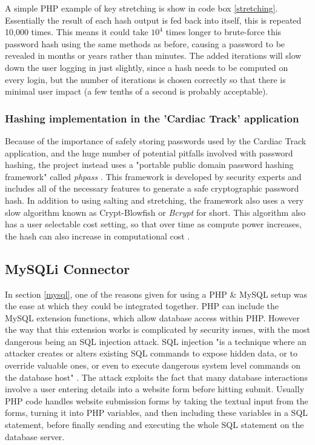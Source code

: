 \documentclass[11pt]{article}
\begin{document}
A simple PHP example of key stretching is show  in code box \ref{stretching}. Essentially the result of each hash output is fed back into itself, this is repeated 10,000 times. This means it could take \(10^4\) times longer to brute-force this password hash using the same methods as before, causing a password to be revealed in months or years rather than minutes. The added iterations will slow down the user logging in just slightly, since a hash needs to be computed on every login, but the number of iterations is chosen correctly so that there is minimal user impact (a few tenths of a second is probably acceptable). 

\subsubsection{Hashing implementation in the 'Cardiac Track' application} \label{phpass-section}

Because of the importance of safely storing passwords used by the Cardiac Track application, and the huge number of potential pitfalls involved with password hashing, the project instead uses a "portable public domain password hashing framework" called \textit{phpass} \cite{phpass}. This framework is developed by security experts and includes all of the necessary features to generate a safe cryptographic password hash. In addition to using salting and stretching, the framework also uses a very slow algorithm known as Crypt-Blowfish or \textit{Bcrypt} for short. This algorithm also has a user selectable cost setting, so that over time as compute power increases, the hash can also increase in computational cost \cite{bcrypt}.

\subsection{MySQLi Connector} \label{mysqli}
In section \ref{mysql}, one of the reasons given for using a PHP \& MySQL setup was the ease at which they could be integrated together. PHP can include the MySQL extension functions, which allow database access within PHP. However the way that this extension works is complicated by security issues, with the most dangerous being an SQL injection attack. SQL injection "is a technique where an attacker creates or alters existing SQL commands to expose hidden data, or to override valuable ones, or even to execute dangerous system level commands on the database host" \cite{sqlinjection:phpmanual}. The attack exploits the fact that many database interactions involve a user entering details into a website form before hitting submit. Usually PHP code handles website submission forms by taking the textual input from the forms, turning it into PHP variables, and then  including these variables in a SQL statement, before finally sending and executing the whole SQL statement on the database server. 
\end{document}
